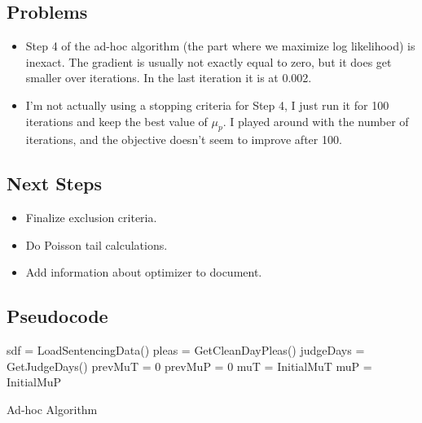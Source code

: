 \documentclass[11pt]{article}
\begin{document}
  \subsection{Problems}
    \begin{itemize}
      \item Step 4 of the ad-hoc algorithm (the part where we maximize log likelihood) is inexact. The gradient is usually not exactly equal to zero, but it does get smaller over iterations. In the last
      iteration it is at 0.002.
      \item I'm not actually using a stopping criteria for Step 4, I just run it for 100 iterations and keep the best value of $\mu_p$. I played around with the number of iterations, and the objective doesn't seem to improve after 100. 
    \end{itemize}

  \subsection{Next Steps}
  \begin{itemize}
    \item Finalize exclusion criteria.
    \item Do Poisson tail calculations.
    \item Add information about optimizer to document.
  \end{itemize}

  \subsection{Pseudocode}
  \begin{algorithm}[H]
    \SetAlgoLined
    sdf = LoadSentencingData()\;
    pleas = GetCleanDayPleas()\;
    judgeDays = GetJudgeDays()\;
    prevMuT = 0\;
    prevMuP = 0\;
    muT = InitialMuT\;
    muP = InitialMuP\;
    \caption{Ad-hoc Algorithm}
    \end{algorithm}
\end{document}
